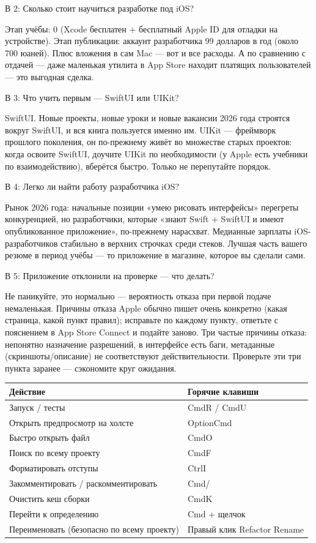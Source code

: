 В 2: Сколько стоит научиться разработке под iOS?

Этап учёбы: 0 (Xcode бесплатен + бесплатный Apple ID для отладки на устройстве). Этап публикации: аккаунт разработчика 99 долларов в год (около 700 юаней). Плюс вложения в сам Mac — вот и все расходы. А по сравнению с отдачей — даже маленькая утилита в App Store находит платящих пользователей — это выгодная сделка.

В 3: Что учить первым — SwiftUI или UIKit?

SwiftUI. Новые проекты, новые уроки и новые вакансии 2026 года строятся вокруг SwiftUI, и вся книга пользуется именно им. UIKit — фреймворк прошлого поколения, он по-прежнему живёт во множестве старых проектов: когда освоите SwiftUI, доучите UIKit по необходимости (у Apple есть учебники по взаимодействию), вберётся быстро. Только не перепутайте порядок.

В 4: Легко ли найти работу разработчика iOS?

Рынок 2026 года: начальные позиции «умею рисовать интерфейсы» перегреты конкуренцией, но разработчики, которые «знают Swift + SwiftUI и имеют опубликованное приложение», по-прежнему нарасхват. Медианные зарплаты iOS-разработчиков стабильно в верхних строчках среди стеков. Лучшая часть вашего резюме в период учёбы — то приложение в магазине, которое вы сделали сами.

В 5: Приложение отклонили на проверке — что делать?

Не паникуйте, это нормально — вероятность отказа при первой подаче немаленькая. Причины отказа Apple обычно пишет очень конкретно (какая страница, какой пункт правил); исправьте по каждому пункту, ответьте с пояснением в App Store Connect и подайте заново. Три частые причины отказа: непонятно назначение разрешений, в интерфейсе есть баги, метаданные (скриншоты/описание) не соответствуют действительности. Проверьте эти три пункта заранее — сэкономите круг ожидания.


\begin{center}
\begin{tabularx}{\linewidth}{|X|X|}
\hline
\textbf{Действие} & \textbf{Горячие клавиши} \tabularnewline
\hline
Запуск / тесты & CmdR / CmdU \tabularnewline
Открыть предпросмотр на холсте & OptionCmd \tabularnewline
Быстро открыть файл & CmdO \tabularnewline
Поиск по всему проекту & CmdF \tabularnewline
Форматировать отступы & CtrlI \tabularnewline
Закомментировать / раскомментировать & Cmd/ \tabularnewline
Очистить кеш сборки & CmdK \tabularnewline
Перейти к определению & Cmd + щелчок \tabularnewline
Переименовать (безопасно по всему проекту) & Правый клик Refactor Rename \tabularnewline
\hline
\end{tabularx}
\end{center}

